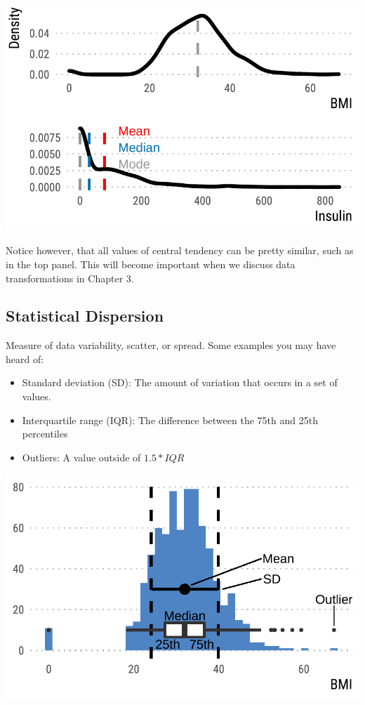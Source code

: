 \documentclass[
  letterpaper,
  DIV=11,
  numbers=noendperiod]{scrreprt}
\begin{document}
\includegraphics{./intro_files/figure-pdf/unnamed-chunk-9-1.pdf}

Notice however, that all values of central tendency can be pretty
similar, such as in the top panel. This will become important when we
discuss data transformations in Chapter 3.

\hypertarget{statistical-dispersion}{%
\subsection{Statistical Dispersion}\label{statistical-dispersion}}

Measure of data variability, scatter, or spread. Some examples you may
have heard of:

\begin{itemize}
\item
  Standard deviation (SD): The amount of variation that occurs in a set
  of values.
\item
  Interquartile range (IQR): The difference between the 75th and 25th
  percentiles
\item
  Outliers: A value outside of \(1.5 * IQR\)
\end{itemize}

\includegraphics{./intro_files/figure-pdf/unnamed-chunk-10-1.pdf}
\end{document}
